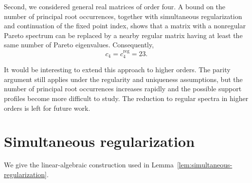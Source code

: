 \documentclass[11pt,a4paper]{article}
\theoremstyle{definition}
\begin{document}
Second, we considered general real matrices of order four. A bound on the number of principal root occurrences, together with simultaneous regularization and continuation of the fixed point index, shows that a matrix with a nonregular Pareto spectrum can be replaced by a nearby regular matrix having at least the same number of Pareto eigenvalues. Consequently,
$$
c_4=c_4^{\mathrm{reg}}=23.
$$

It would be interesting to extend this approach to higher orders. The parity argument still applies under the regularity and uniqueness assumptions, but the number of principal root occurrences increases rapidly and the possible support profiles become more difficult to study. The reduction to regular spectra in higher orders is left for future work.

\appendix

\section{Simultaneous regularization}
\label{app:simultaneous-regularization}

We give the linear-algebraic construction used in
Lemma~\ref{lem:simultaneous-regularization}.
\end{document}
